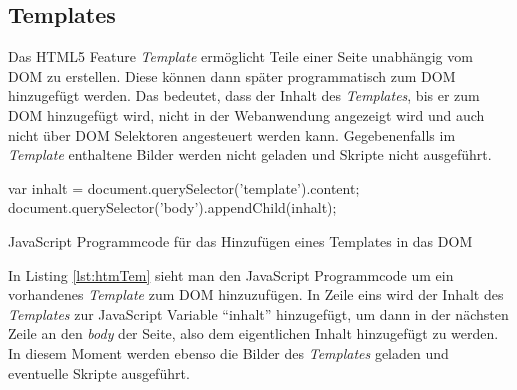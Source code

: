 \documentclass[12pt, paper=a4, bibtotoc, toc=listof, headsepline=true, numbers=endperiod]{scrreprt}
\begin{document}
		\subsection{Templates}
		\label{subsec:Templates}
		Das \ac{HTML5} Feature \emph{Template} ermöglicht Teile einer Seite unabhängig vom \ac{DOM} zu erstellen. Diese können dann später programmatisch zum \ac{DOM} hinzugefügt werden\cite[S.177]{Cameron2015}. Das bedeutet, dass der Inhalt des \emph{Templates}, bis er zum \ac{DOM} hinzugefügt wird, nicht in der Webanwendung angezeigt wird und auch nicht über \ac{DOM} Selektoren angesteuert werden kann. Gegebenenfalls im \emph{Template} enthaltene Bilder werden nicht geladen und Skripte nicht ausgeführt\cite{Potschien2013}.
		\begin{listing}
			\begin{JavaScriptcode*}{}
var inhalt = document.querySelector('template').content;
document.querySelector('body').appendChild(inhalt);
			\end{JavaScriptcode*}
			\caption[Hinzufügen eines Templates]{JavaScript Programmcode für das Hinzufügen eines Templates in das DOM}
			\label{lst:htmTem}
		\end{listing}
		In Listing \ref{lst:htmTem} sieht man den JavaScript Programmcode um ein vorhandenes \emph{Template} zum \ac{DOM} hinzuzufügen. In Zeile eins wird der Inhalt des \emph{Templates} zur JavaScript Variable \enquote{inhalt} hinzugefügt, um dann in der nächsten Zeile an den \emph{body} der Seite, also dem eigentlichen Inhalt hinzugefügt zu werden. In diesem Moment werden ebenso die Bilder des \emph{Templates} geladen und eventuelle Skripte ausgeführt.
\end{document}
